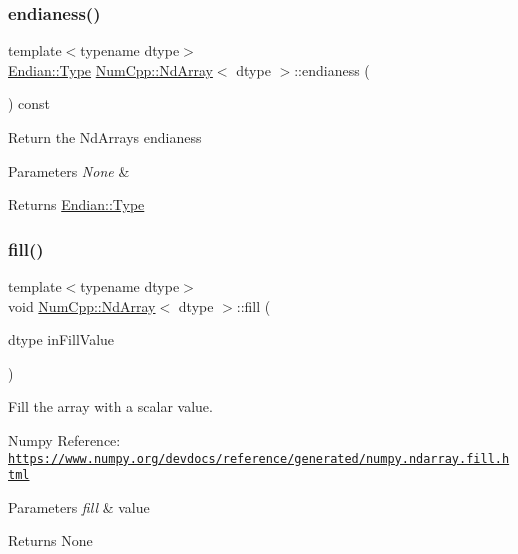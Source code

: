 \subsubsection{\texorpdfstring{endianess()}{endianess()}}
{\footnotesize\ttfamily template$<$typename dtype$>$ \\
\mbox{\hyperlink{struct_num_cpp_1_1_endian_a4b4f3e02f68302be202402f5d5501445}{Endian\+::\+Type}} \mbox{\hyperlink{class_num_cpp_1_1_nd_array}{Num\+Cpp\+::\+Nd\+Array}}$<$ dtype $>$\+::endianess (\begin{DoxyParamCaption}{ }\end{DoxyParamCaption}) const\hspace{0.3cm}{\ttfamily [inline]}}

Return the Nd\+Arrays endianess


\begin{DoxyParams}{Parameters}
{\em None} & \\
\hline
\end{DoxyParams}
\begin{DoxyReturn}{Returns}
\mbox{\hyperlink{struct_num_cpp_1_1_endian_a4b4f3e02f68302be202402f5d5501445}{Endian\+::\+Type}} 
\end{DoxyReturn}
\mbox{\label{class_num_cpp_1_1_nd_array_abe38a848fb5280ef2d091168ff3d4a57}} 
\subsubsection{\texorpdfstring{fill()}{fill()}}
{\footnotesize\ttfamily template$<$typename dtype$>$ \\
void \mbox{\hyperlink{class_num_cpp_1_1_nd_array}{Num\+Cpp\+::\+Nd\+Array}}$<$ dtype $>$\+::fill (\begin{DoxyParamCaption}\item[{dtype}]{in\+Fill\+Value }\end{DoxyParamCaption})\hspace{0.3cm}{\ttfamily [inline]}}

Fill the array with a scalar value.

Numpy Reference\+: \href{https://www.numpy.org/devdocs/reference/generated/numpy.ndarray.fill.html}{\tt https\+://www.\+numpy.\+org/devdocs/reference/generated/numpy.\+ndarray.\+fill.\+html}


\begin{DoxyParams}{Parameters}
{\em fill} & value \\
\hline
\end{DoxyParams}
\begin{DoxyReturn}{Returns}
None 
\end{DoxyReturn}
\mbox{\label{class_num_cpp_1_1_nd_array_aaf835c0f1977dda3fa78ae69fe8b0a7b}} 
